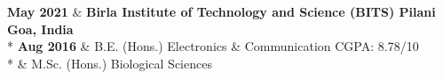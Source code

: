 \newcommand\educationCust[7]{
  \textbf{#1}    & \textbf{#2} \hfill \textbf{#3}   					\\*
  \textbf{#4}    & #6          \hfill  CGPA: #7/10                      \\*
                 & #5
  }

\begin{educations}
 \emptySeparator
  \educationCust
    {May 2021}   {Birla Institute of Technology and Science (BITS) Pilani}{Goa, India}
    {Aug 2016}  {M.Sc. (Hons.) Biological Sciences}
                {B.E.  (Hons.) Electronics \& Communication}  
    {8.78}
\end{educations}
\vspace{-3mm}
